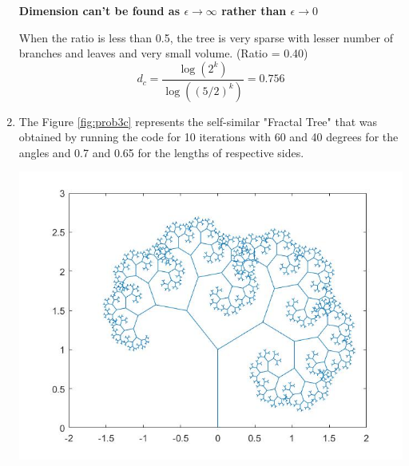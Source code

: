 \documentclass[11pt,a4paper]{article}
\begin{document}
\begin{enumerate}[label=(\alph*)]
\centerline
{\textbf{Dimension can't be found as $\epsilon \to \infty$ rather than $\epsilon \to 0$}}\par\medskip
When the ratio is less than 0.5, the tree is very sparse with lesser number of branches and leaves and very small volume. (Ratio = 0.40)
$$d_c = \frac{\log(2^k)}{\log((5/2)^k)} = 0.756$$

\item
The Figure \ref{fig:prob3c} represents the self-similar "Fractal Tree" that was obtained by running the code for 10 iterations with 60 and 40 degrees for the angles and 0.7 and 0.65 for the lengths of respective sides. \\
\begin{minipage}{\linewidth}
{
\centering 
\includegraphics[scale=0.40]{images/prob3c.jpg}
\label{fig:prob3c}
}
\end{minipage}


\end{enumerate}
\end{document}
